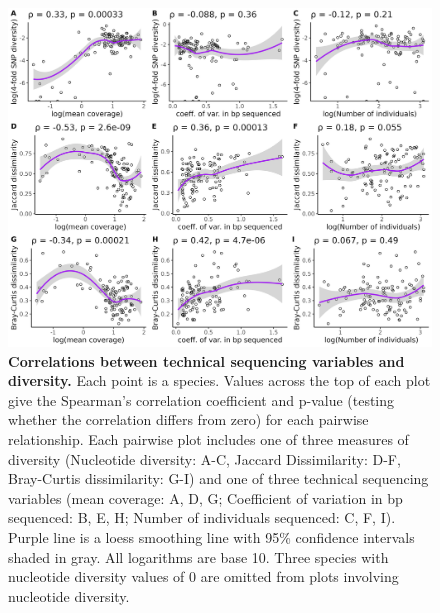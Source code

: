 \documentclass[12pt]{article}
\begin{document}
\begin{figure}[H]
    \centering
    \includegraphics[width=\textwidth]{figures/appendix_d/coverage_vs_diversity_2025-01-09.jpg}
    \caption{\textbf{Correlations between technical sequencing variables and diversity.} Each point is a species. Values across the top of each plot give the Spearman's correlation coefficient and p-value (testing whether the correlation differs from zero) for each pairwise relationship. Each pairwise plot includes one of three measures of diversity (Nucleotide diversity: A-C, Jaccard Dissimilarity: D-F, Bray-Curtis dissimilarity: G-I) and one of three technical sequencing variables (mean coverage: A, D, G; Coefficient of variation in bp sequenced: B, E, H; Number of individuals sequenced: C, F, I). Purple line is a loess smoothing line with 95\% confidence intervals shaded in gray. All logarithms are base 10. Three species with nucleotide diversity values of 0 are omitted from plots involving nucleotide diversity.}
\end{figure}
\end{document}
